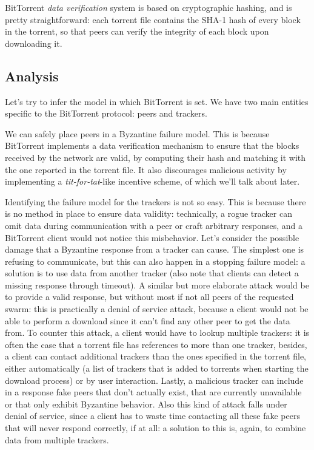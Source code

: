 \documentclass[mscthesis]{usiinfthesis}
\begin{document}
BitTorrent \emph{data verification} system is based on cryptographic hashing, and is pretty straightforward: each torrent file contains the SHA-1 hash of every block in the torrent, so that peers can verify the integrity of each block upon downloading it.

\subsection{Analysis}\label{sec:btanalysis}

Let's try to infer the model in which BitTorrent is set. We have two main entities specific to the BitTorrent protocol: peers and trackers. 

We can safely place peers in a Byzantine failure model. This is because BitTorrent implements a data verification mechanism to ensure that the blocks received by the network are valid, by computing their hash and matching it with the one reported in the torrent file. It also discourages malicious activity by implementing a \textit{tit-for-tat}-like incentive scheme, of which we'll talk about later.

Identifying the failure model for the trackers is not so easy. This is because there is no method in place to ensure data validity: technically, a rogue tracker can omit data during communication with a peer or craft arbitrary responses, and a BitTorrent client would not notice this misbehavior. Let's consider the possible damage that a Byzantine response from a tracker can cause. The simplest one is refusing to communicate, but this can also happen in a stopping failure model: a solution is to use data from another tracker (also note that clients can detect a missing response through timeout). A similar but more elaborate attack would be to provide a valid response, but without most if not all peers of the requested swarm: this is practically a denial of service attack, because a client would not be able to perform a download since it can't find any other peer to get the data from. To counter this attack, a client would have to lookup multiple trackers: it is often the case that a torrent file has references to more than one tracker, besides, a client can contact additional trackers than the ones specified in the torrent file, either automatically (a list of trackers that is added to torrents when starting the download process) or by user interaction. Lastly, a malicious tracker can include in a response fake peers that don't actually exist, that are currently unavailable or that only exhibit Byzantine behavior. Also this kind of attack falls under denial of service, since a client has to waste time contacting all these fake peers that will never respond correctly, if at all: a solution to this is, again, to combine data from multiple trackers.
\end{document}
